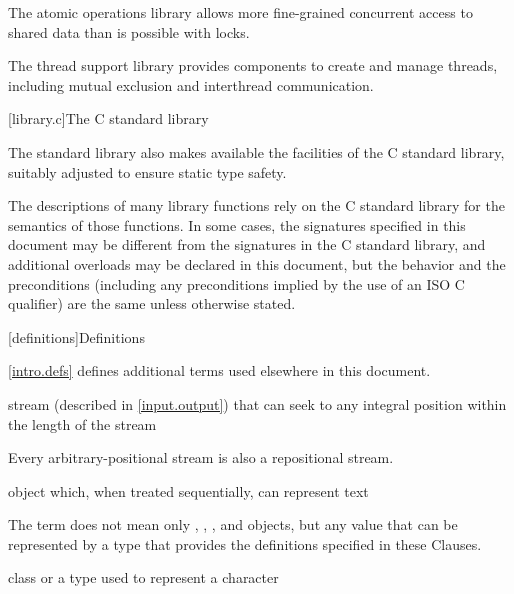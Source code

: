 \pnum
The atomic operations library allows more fine-grained
concurrent access to shared data than is possible with locks.

\pnum
The thread support library provides components to create
and manage threads, including mutual exclusion and interthread communication.

[library.c]{The C standard library}

\pnum
The \Cpp{} standard library also makes available the facilities of the C standard library,
%
suitably adjusted to ensure static type safety.

\pnum
The descriptions of many library functions rely on the C standard library for
the semantics of those functions.
In some cases,
the signatures specified in this document
may be different from the signatures in the C standard library,
and additional overloads may be declared in this document,
but the behavior and the preconditions
(including any preconditions implied by the use of an
ISO C  qualifier)
are the same unless otherwise stated.

[definitions]{Definitions}

\pnum
\begin{note}
\ref{intro.defs} defines additional terms used elsewhere in this document.
\end{note}

%
stream (described in \ref{input.output}) that can seek to any integral position within
the length of the stream

\begin{defnote}
Every arbitrary-positional stream is also a repositional stream.
\end{defnote}

%
object which,
when treated sequentially,
can represent text

\begin{defnote}
The term does not mean only
,
,
,
and
objects,
but any value that can be represented by a type
that provides the definitions specified in these Clauses.
\end{defnote}

%
class or a type used to
represent a character

